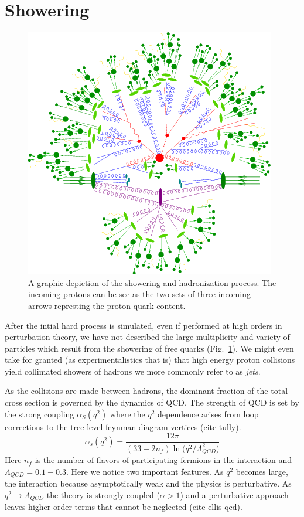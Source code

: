 \section{Showering}

\begin{figure}
\begin{center}
\includegraphics[width=.45\textwidth]{pics/hadronization}
\end{center}
\caption{A graphic depiction of the showering and hadronization process. The incoming protons can be see as the two sets of three
incoming arrows represting the proton quark content.}
\label{fig:showering}
\end{figure}


After the intial hard process is simulated, even if performed at high orders in perturbation theory, we have not described the large multiplicity and variety of particles which result from the showering of free quarks (Fig.~\ref{fig:showering}). We 
might even take for granted (as experimentalistics that is) that high energy proton 
collisions yield collimated showers of hadrons we more commonly refer to as \textit{jets}. 

As the collisions are made between hadrons, the dominant fraction
of the total cross section is governed by the dynamics of QCD. The strength of QCD is set by the strong coupling $\alpha_S(q^2)$ where the $q^2$ dependence arises from loop corrections to the tree level feynman diagram vertices (cite-tully). 
\begin{equation} \label{eq:running_qcd}
\alpha_s(q^2) = \frac{12\pi}{(33-2n_f)\ln{(q^2 /\Lambda_{QCD}^2})}
\end{equation}
Here $n_f$ is the number of flavors of participating fermions in the interaction and $\Lambda_{QCD}=0.1-0.3$. Here we notice two important features. As $q^2$ becomes large, the interaction because asymptotically weak and the physics is perturbative. As $q^2\rightarrow \Lambda_{QCD}$ the theory is
strongly coupled ($\alpha > 1$) and a perturbative approach leaves higher order terms that cannot be neglected 
(cite-ellis-qcd). 

